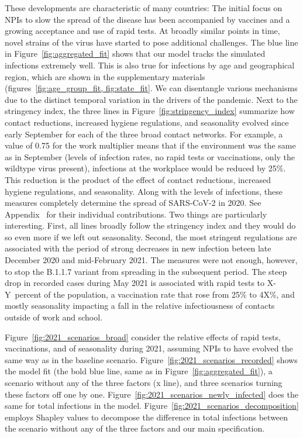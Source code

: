 These developments are characteristic of many countries: The initial focus on NPIs to slow the spread of the disease has been accompanied by vaccines and a growing acceptance and use of rapid tests. At broadly similar points in time, novel strains of the virus have started to pose additional challenges. The blue line in Figure~\ref{fig:aggregated_fit} shows that our model tracks the simulated infections extremely well. This is also true for infections by age and geographical region, which are shown in the supplementary materials (figures~\ref{fig:age_group_fit, fig:state_fit}. We can disentangle various mechanisms due to the distinct temporal variation in the drivers of the pandemic. Next to the stringency index, the three lines in Figure~\ref{fig:stringency_index} summarize how contact reductions, increased hygiene regulations, and seasonality evolved since early September for each of the three broad contact networks. For example, a value of 0.75 for the work multiplier means that if the environment was the same as in September (levels of infection rates, no rapid tests or vaccinations, only the wildtype virus present), infections at the workplace would be reduced by 25\%. This reduction is the product of the effect of contact reductions, increased hygiene regulations, and seasonality. Along with the levels of infections, these measures completely determine the spread of SARS-CoV-2 in 2020. See Appendix~ for their individual contributions. Two things are particularly interesting. First, all lines broadly follow the stringency index and they would do so even more if we left out seasonality. Second, the most stringent regulations are associated with the period of strong decreases in new infection beteen late December 2020 and mid-February 2021. The measures were not enough, however, to stop the B.1.1.7 variant from spreading in the subsequent period. The steep drop in recorded cases during May 2021 is associated with rapid tests to X-Y~percent of the population, a vaccination rate that rose from 25\% to 4X\%, and mostly seasonality impacting a fall in the relative infectiousness of contacts outside of work and school.

Figure~\ref{fig:2021_scenarios_broad} consider the relative effects of rapid tests, vaccinations, and of seasonality during 2021, assuming NPIs to have evolved the same way as in the baseline scenario. Figure~\ref{fig:2021_scenarios_recorded} shows the model fit (the bold blue line, same as in Figure~\ref{fig:aggregated_fit}), a scenario without any of the three factors (x line), and three scenarios turning these factors off one by one. Figure~\ref{fig:2021_scenarios_newly_infected} does the same for total infections in the model. Figure~\ref{fig:2021_scenarios_decomposition} employs Shapley values to decompose the difference in total infections between the scenario without any of the three factors and our main specification.

